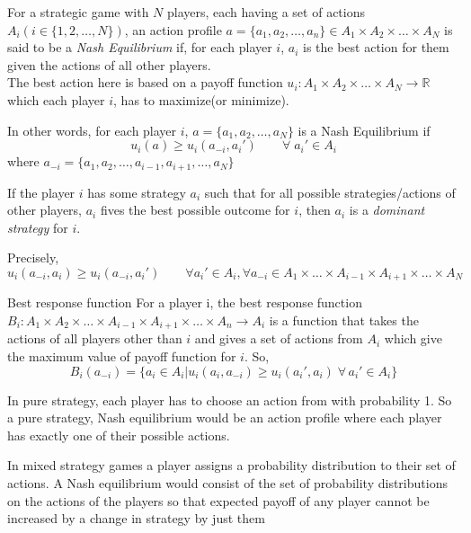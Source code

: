 \begin{definition}
For a strategic game with $N$ players, each having a set of actions 
$ A_i (i \in \{ 1, 2, \ldots, N \} ) $, an action profile 
$a = \{ a_1, a_2, \ldots , a_n \} \in A_1 \times A_2 \times \ldots \times A_N$ is said to be a \textit{Nash Equilibrium} if, for each player $i$, $a_i$ is the best action for them given the actions of all other players. \\
The best action here is based on a payoff function $u_i : A_1 \times A_2 \times \ldots \times A_N \longrightarrow \mathbb{R}$ which each player $i$, has to maximize(or minimize).

In other words, for each player $i$, $a = \{ a_1, a_2, \ldots , a_N \}$ is a Nash Equilibrium if
\[
u_i(a) \ge u_i(a_{-i}, a_i' ) \qquad \forall \; a_i' \in A_i
\]
where $a_{-i} = \{ a_1, a_2, \ldots , a_{i-1}, a_{i+1}, \ldots , a_N \}$

\end{definition}

\begin{definition}
If the player $i$ has some strategy $a_i$ such that for all possible strategies/actions of other players, $a_i$ fives the best possible outcome for $i$, then $a_i$ is a \textit{dominant strategy} for $i$.

Precisely,
\[
u_i(a_{-i}, a_i) \ge u_i(a_{-i}, a_i') \qquad \forall a_i' \in A_i, \forall a_{-i} \in A_1 \times \ldots \times A_{i-1} \times A_{i+1} \times \ldots \times A_N
\]
\end{definition}


\begin{definition}
Best response function For a player i, the best response function 
$B_i : A_1\times A_2 \times \ldots \times A_{i-1}\times A_{i+1} \times \ldots \times A_n \rightarrow A_i$ is a function that takes the actions of all players other than $i$ and gives a set of actions from $A_i$ which give the maximum value of payoff function for $i$.
So,
\[
B_i(a_{-i}) = \{a_i \in A_i | u_i(a_i,a_{-i})\ge u_i(a_i',a_i) \; \forall \, a_i' \in A_i\}
\]
\end{definition}

\begin{definition}
In pure strategy, each player has to choose an action from with probability
1. So a pure strategy, Nash equilibrium would be an action profile where
each player has exactly one of their possible actions.
\end{definition}

\begin{definition}
In mixed strategy games a player assigns a probability distribution to
their set of actions. A Nash equilibrium would consist of the set of 
probability distributions on the actions of the players so that expected payoff of any player cannot be increased by a change in strategy by just 
them
\end{definition}
